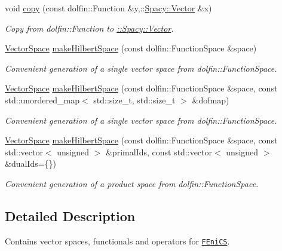 \begin{DoxyCompactItemize}
void \hyperlink{namespaceSpacy_1_1FEniCS_a7c4519bd0cbdc4e72b71f273bade591e_a7c4519bd0cbdc4e72b71f273bade591e}{copy} (const dolfin\+::\+Function \&y,\+::\hyperlink{classSpacy_1_1Vector}{Spacy\+::\+Vector} \&x)
\begin{DoxyCompactList}\small\item\em Copy from dolfin\+::\+Function to \hyperlink{group__SpacyGroup_gafc144d2730ef87a67e54f8cd750b1f54_VectorAnchor}{\+:\+:Spacy\+:\+:Vector}. \end{DoxyCompactList}\item 
\hyperlink{classSpacy_1_1VectorSpace}{Vector\+Space} \hyperlink{group__FenicsGroup_ga89defe8c7e08ab224af2a3cd0445e254_ga89defe8c7e08ab224af2a3cd0445e254}{make\+Hilbert\+Space} (const dolfin\+::\+Function\+Space \&space)
\begin{DoxyCompactList}\small\item\em Convenient generation of a single vector space from dolfin\+::\+Function\+Space. \end{DoxyCompactList}\item 
\hyperlink{classSpacy_1_1VectorSpace}{Vector\+Space} \hyperlink{group__FenicsGroup_ga1aaf48bfbd005bee810090a01404ab4a_ga1aaf48bfbd005bee810090a01404ab4a}{make\+Hilbert\+Space} (const dolfin\+::\+Function\+Space \&space, const std\+::unordered\+\_\+map$<$ std\+::size\+\_\+t, std\+::size\+\_\+t $>$ \&dofmap)
\begin{DoxyCompactList}\small\item\em Convenient generation of a single vector space from dolfin\+::\+Function\+Space. \end{DoxyCompactList}\item 
\hyperlink{classSpacy_1_1VectorSpace}{Vector\+Space} \hyperlink{group__FenicsGroup_gaa16b365c49ec0660e5f707ad7da38a75_gaa16b365c49ec0660e5f707ad7da38a75}{make\+Hilbert\+Space} (const dolfin\+::\+Function\+Space \&space, const std\+::vector$<$ unsigned $>$ \&primal\+Ids, const std\+::vector$<$ unsigned $>$ \&dual\+Ids=\{\})
\begin{DoxyCompactList}\small\item\em Convenient generation of a product space from dolfin\+::\+Function\+Space. \end{DoxyCompactList}\end{DoxyCompactItemize}


\subsection{Detailed Description}
Contains vector spaces, functionals and operators for \href{www.fenicsproject.org}{\tt F\+Eni\+C\+S}. 

